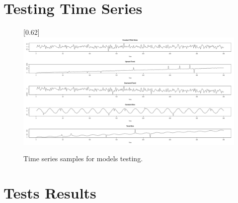 \chapter{Testing Time Series} \label{appen:testing-samples}
    \begin{figure}[H]
        \begin{center}
            \scalebox{0.22}[0.62]{\includegraphics[angle=0]{img/testing-time-series.pdf}}
            \caption{Time series samples for models testing.}
            \label{appen:img-testing-samples}
        \end{center}
    \end{figure}

\chapter{Tests Results} \label{appen:chap:results}

